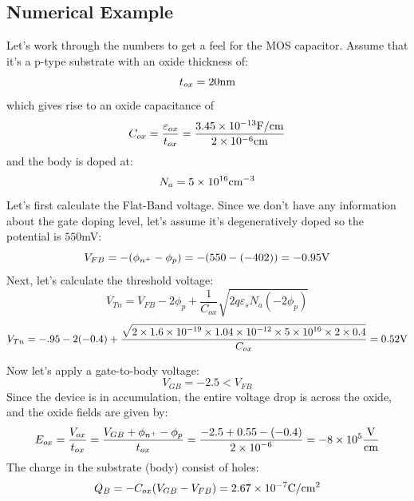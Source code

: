 \subsection{Numerical Example}

Let's work through the numbers to get a feel for the  MOS capacitor.   Assume that it's a  p-type substrate with an oxide thickness of:
\begin{equation}
{t_{ox}} = 20{\rm{nm}}
\end{equation}
%
which gives rise to an oxide capacitance of 
%
\begin{equation}
{C_{ox}} = \frac{{{\varepsilon _{ox}}}}{{{t_{ox}}}} = \frac{{3.45 \times {{10}^{ - 13}}{\rm{F/cm}}}}{{{\rm{2}} \times {\rm{1}}{{\rm{0}}^{{\rm{ - 6}}}}{\rm{cm}}}}
\end{equation}
%
and the body is doped at:
%
\begin{equation}
{N_a} = 5 \times {10^{16}}{\rm{c}}{{\rm{m}}^{ - 3}}
\end{equation}
%
Let's first calculate the Flat-Band voltage.  Since we don't have any information about the gate doping level, let's assume it's degeneratively doped so the potential is $550$mV:
%
\begin{equation}
{V_{FB}} =  - ({\phi _{{n^ + }}} - {\phi _p}) =  - (550 - ( - 402)) =  - 0.95{\rm{V}}
\end{equation}
%
Next, let's calculate the threshold voltage:
%
%
\begin{equation}
{V_{Tn}} = {V_{FB}} - 2{\phi _p} + \frac{1}{{{C_{ox}}}}\sqrt {2q{\varepsilon _s}{N_a}( - 2{\phi _p})} 
\end{equation}
%
\begin{equation}
{V_{Tn}} =  - .95 - 2( - 0.4) + \frac{{\sqrt {2 \times 1.6 \times {{10}^{ - 19}} \times 1.04 \times {{10}^{ - 12}} \times 5 \times {{10}^{16}} \times 2 \times 0.4} }}{{{C_{ox}}}} = 0.52{\rm{V}}
\end{equation}

Now let's apply a gate-to-body voltage:
\begin{equation}
{V_{GB}} =  - 2.5 < {V_{FB}}
\end{equation}
Since the device is in accumulation, the entire voltage drop is across the oxide, and the oxide fields are given by:
%
\begin{equation}
{E_{ox}} = \frac{{{V_{ox}}}}{{{t_{ox}}}} = \frac{{{V_{GB}} + {\phi _{{n^ + }}} - {\phi _p}}}{{{t_{ox}}}} = \frac{{ - 2.5 + 0.55 - ( - 0.4)}}{{2 \times {{10}^{ - 6}}}} =  - 8 \times {10^5}\frac{{\rm{V}}}{{{\rm{cm}}}}
\end{equation}
%
The charge in the substrate (body) consist of holes:
\begin{equation}
{Q_B} =  - {C_{ox}}({V_{GB}} - {V_{FB}}) = 2.67 \times {10^{ - 7}}{\rm{C/c}}{{\rm{m}}^{\rm{2}}}
\end{equation}

 
 





